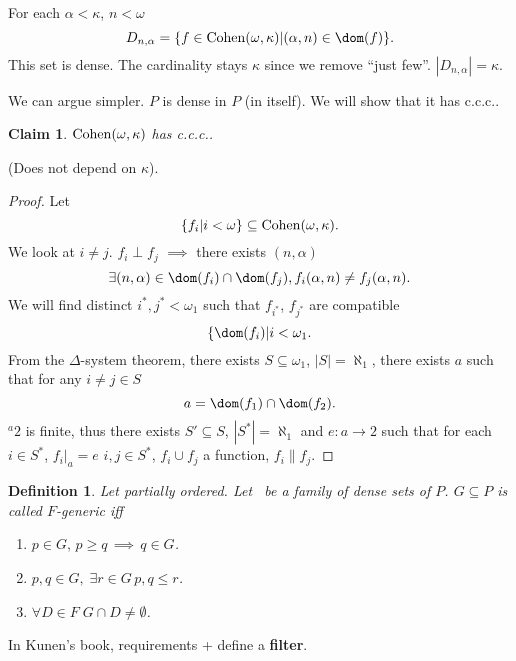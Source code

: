 \documentclass[11pt,pdftex,twoside,a4paper]{article}
\newcommand{\B}[1]{\textbf{#1}}
\newcommand{\Cohen}{\mathop{\rm Cohen}\nolimits}
\newcommand{\ccc}{c.c.c.}
\newtheorem{ldef}[thm]{Definition}
\newtheorem{claim}[thm]{Claim}
\begin{document}
For each \(\alpha < \kappa\), \(n < \omega\)
\begin{equation*}
D_{n,\alpha} = \{f\in \Cohen(\omega,\kappa)| (\alpha,n)\in\dom(f)\}.
\end{equation*}
This set is dense. The cardinality stays \(\kappa\)
since we remove ``just few''.
\(|D_{n,\alpha}|=\kappa\).

We can argue simpler. $P$ is dense in $P$ (in itself).
We will show that it has \ccc.

\begin{claim}
\(\Cohen(\omega,\kappa)\) has \ccc.
\end{claim}
(Does not depend on \(\kappa\)).
\begin{proof}
Let
\begin{equation*}
\{f_i| i < \omega\} \subseteq \Cohen(\omega,\kappa).
\end{equation*}
We look at \(i\neq j\).
\(f_i \perp f_j\)  \(\implies\) there exists \((n,\alpha)\)
\begin{equation*}
\exists(n,\alpha) \in \dom(f_i)\cap\dom(f_j), f_i(\alpha,n) \neq f_j(\alpha,n).
\end{equation*}
We will find distinct \(i^*,j^* < \omega_1\) such that
\(f_{i^*}\), \(f_{j^*}\) are compatible
\begin{equation*}
\{\dom(f_i) | i < \omega_1.
\end{equation*}
From the \(\Delta\)-system theorem, there exists \(S\subseteq \omega_1\),
\(|S|=\aleph_1\), there exists $a$ such that for any \(i\neq j\in S\)
\begin{equation*}
a = \dom(f_1) \cap \dom(f_2).
\end{equation*}
\({}^a 2\) is finite, thus there exists \(S'\subseteq S\), \(|S^*| = \aleph_1\)
and \(e: a\to 2\) such that for each \(i\in S^*\), \(f_i|_a = e\)
\(i,j\in S^*\), \(f_i \cup f_j\) a function, \(f_i\| f_j\).
\end{proof}

\begin{ldef}
Let  partially ordered.
Let \scrF\ be a family of dense sets of $P$. \(G\subseteq P\)
is called $F$-generic iff
\begin{enumerate}
\item \(p\in G,\,p \geq q\,\implies\, q\in G\).
\item \(p,q\in G,\; \exists r\in G\, p,q \leq r\).
\item \(\forall D\in F\; G\cap D\neq \emptyset\).
\end{enumerate}
\end{ldef}
In Kunen's book, requirements + define a \B{filter}.
\end{document}
